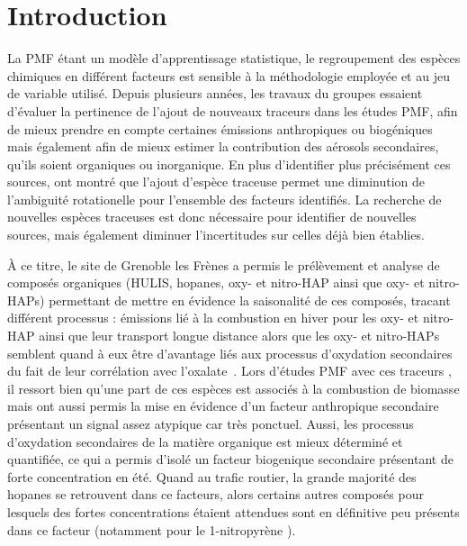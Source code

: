 
\section{Introduction}%
\label{sec:introduction}

La PMF étant un modèle d'apprentissage statistique, le regroupement des espèces chimiques
en différent facteurs est sensible à la méthodologie employée et au jeu de variable
utilisé.
Depuis plusieurs années, les travaux du groupes essaient d'évaluer la pertinence de
l'ajout de nouveaux traceurs dans les études PMF, afin de mieux prendre en compte
certaines émissions anthropiques ou biogéniques mais également afin de mieux estimer la
contribution des aérosols secondaires, qu'ils soient organiques ou inorganique.
En plus d'identifier plus précisément ces sources, \cite{emamiEffect2017} ont montré que
l'ajout d'espèce traceuse permet une diminution de l'ambiguité rotationelle pour
l'ensemble des facteurs identifiés. La recherche de nouvelles espèces traceuses est donc
nécessaire pour identifier de nouvelles sources, mais également diminuer l'incertitudes
sur celles déjà bien établies.

À ce titre, le site de Grenoble les Frènes a permis le prélèvement et analyse de composés
organiques (HULIS, hopanes, oxy- et nitro-HAP ainsi que oxy- et nitro-HAPs) permettant de mettre en
évidence la saisonalité de ces composés, tracant différent processus : émissions lié à la
combustion en hiver pour les oxy- et nitro-HAP ainsi que leur transport longue distance
alors que les oxy- et nitro-HAPs semblent quand à eux être d'avantage liés aux processus
d'oxydation secondaires du fait de leur corrélation avec
l'oxalate~\textcite{tomazSources2017a}.
Lors d'études PMF avec ces traceurs \autocite{srivastavaSpeciation2018a}, il ressort bien
qu'une part de ces espèces est associés à la combustion de biomasse mais ont aussi permis
la mise en évidence d'un facteur anthropique secondaire présentant un signal assez
atypique car très ponctuel. Aussi, les processus d'oxydation secondaires de la matière
organique est mieux déterminé et quantifiée, ce qui a permis d'isolé un facteur biogenique
secondaire présentant de forte concentration en été. Quand au trafic routier, la grande
majorité des hopanes se retrouvent dans ce facteurs, alors certains autres composés pour
lesquels des fortes concentrations étaient attendues sont en définitive peu présents dans
ce facteur (notamment pour le 1-nitropyrène \textcite{ringuetDiurnal2012}).

